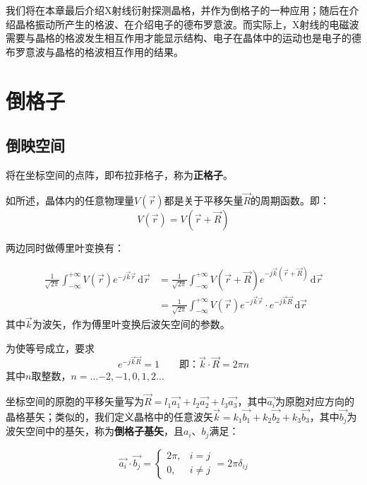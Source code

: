    我们将在本章最后介绍X射线衍射探测晶格，并作为倒格子的一种应用；随后在介绍晶格振动所产生的格波、在介绍电子的德布罗意波。而实际上，X射线的电磁波需要与晶格的格波发生相互作用才能显示结构、电子在晶体中的运动也是电子的德布罗意波与晶格的格波相互作用的结果。
    
\section{倒格子}
\subsection{倒映空间}
    将在坐标空间的点阵，即布拉菲格子，称为\textbf{正格子}。

    如所述，晶体内的任意物理量$V(\vec{r})$都是关于平移矢量$\vec{R}$的周期函数。即：
    \begin{equation}
        V(\vec{r})=V(\vec{r}+\vec{R})
    \end{equation}

    两边同时做傅里叶变换有：

    \begin{equation}
    \begin{aligned}
        \frac{1}{\sqrt{2\pi}}\int_{-\infty}^{+\infty} V(\vec{r})e^{-j\vec{k}\vec{r}} \,\mathrm{d}\vec{r}&=\frac{1}{\sqrt{2\pi}}\int_{-\infty}^{+\infty} V(\vec{r}+\vec{R})e^{-j\vec{k}(\vec{r}+\vec{R})} \,\mathrm{d}\vec{r}\\
        &=\frac{1}{\sqrt{2\pi}}\int_{-\infty}^{+\infty} V(\vec{r})e^{-j\vec{k}\vec{r}}\cdot e^{-j\vec{k}\vec{R}} \,\mathrm{d}\vec{r}
    \end{aligned}
    \end{equation}
    其中$\vec{k}$为波矢，作为傅里叶变换后波矢空间的参数。

    为使等号成立，要求
    \begin{equation}
        e^{-j\vec{k}\vec{R}}=1\qquad\mbox{即：}\vec{k}\cdot\vec{R}=2\pi n
    \end{equation}
    其中$n$取整数，$n=\dots{-2},-1,0,1,2\dots$

    坐标空间的原胞的平移矢量写为$\vec{R}=l_1\vec{a_1}+l_2\vec{a_2}+l_3\vec{a_3}$，其中$\vec{a_i}$为原胞对应方向的晶格基矢；类似的，我们定义晶格中的任意波矢$\vec{k}=k_1\vec{b_1}+k_2\vec{b_2}+k_3\vec{b_3}$，其中$\vec{b_j}$为波矢空间中的基矢，称为\textbf{倒格子基矢}，且$a_i$、$b_j$满足：

    \begin{equation}\label{eq:2.6}
        \vec{a_i}\cdot\vec{b_j}=
        \begin{cases}
            2\pi,&i=j\\
            0,&i\neq j
        \end{cases}
        =2\pi\delta_{ij}
    \end{equation}

